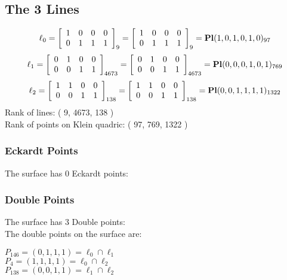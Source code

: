 \documentclass{article}
\begin{document}
{\subsection*{The 3 Lines}
$$
\ell_{0} = 
\left[
\begin{array}{*{4}{r}}
1 & 0 & 0 & 0\\
0 & 1 & 1 & 1\\
\end{array}
\right]
_{9}
=
\left[
\begin{array}{*{4}c}
1  & 0  & 0  & 0\\
0  & 1  & 1  & 1\\
\end{array}
\right]_{9}
={\rm\bf Pl}(1,0,1,0,1,0 )_{97}$$
$$
\ell_{1} = 
\left[
\begin{array}{*{4}{r}}
0 & 1 & 0 & 0\\
0 & 0 & 1 & 1\\
\end{array}
\right]
_{4673}
=
\left[
\begin{array}{*{4}c}
0  & 1  & 0  & 0\\
0  & 0  & 1  & 1\\
\end{array}
\right]_{4673}
={\rm\bf Pl}(0,0,0,1,0,1 )_{769}$$
$$
\ell_{2} = 
\left[
\begin{array}{*{4}{r}}
1 & 1 & 0 & 0\\
0 & 0 & 1 & 1\\
\end{array}
\right]
_{138}
=
\left[
\begin{array}{*{4}c}
1  & 1  & 0  & 0\\
0  & 0  & 1  & 1\\
\end{array}
\right]_{138}
={\rm\bf Pl}(0,0,1,1,1,1 )_{1322}$$
Rank of lines: ( 9, 4673, 138 )\\
Rank of points on Klein quadric: ( 97, 769, 1322 )\\
\subsubsection*{Eckardt Points}
The surface has 0 Eckardt points:\\
\subsubsection*{Double Points}
The surface has 3 Double points:\\
The double points on the surface are:\\
\begin{multicols}{2}
\noindent
$P_{146} = ( 0, 1, 1, 1 ) = \ell_{0} \cap \ell_{1} $\\
$P_{4} = ( 1, 1, 1, 1 ) = \ell_{0} \cap \ell_{2} $\\
$P_{138} = ( 0, 0, 1, 1 ) = \ell_{1} \cap \ell_{2} $\\
\end{multicols}
}
\end{document}
